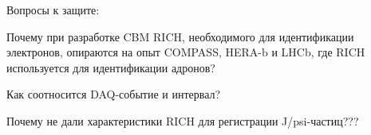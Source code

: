 Вопросы к защите:

Почему при разработке CBM RICH, необходимого для идентификации электронов, опираются на опыт COMPASS, HERA-b и LHCb, где RICH используется для идентификации адронов?

Как соотносится DAQ-событие и интервал?

Почему не дали характеристики RICH для регистрации J/psi-частиц???